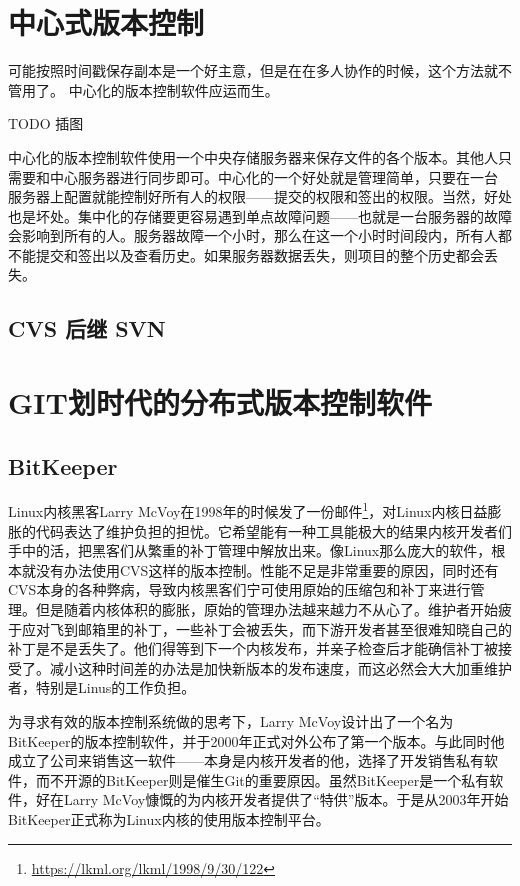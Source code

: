 \section{中心式版本控制}

可能按照时间戳保存副本是一个好主意，但是在在多人协作的时候，这个方法就不管用了。
中心化的版本控制软件应运而生。

TODO 插图

中心化的版本控制软件使用一个中央存储服务器来保存文件的各个版本。其他人只需要和中心服务器进行同步即可。中心化的一个好处就是管理简单，只要在一台 服务器上配置就能控制好所有人的权限——提交的权限和签出的权限。当然，好处也是坏处。集中化的存储要更容易遇到单点故障问题——也就是一台服务器的故障会影响到所有的人。服务器故障一个小时，那么在这一个小时时间段内，所有人都不能提交和签出以及查看历史。如果服务器数据丢失，则项目的整个历史都会丢失。


\subsection{CVS 后继 SVN}

\section{GIT划时代的分布式版本控制软件}\label{sec:git}
 
\subsection{BitKeeper}

Linux内核黑客Larry McVoy在1998年的时候发了一份邮件\footnote{\url{https://lkml.org/lkml/1998/9/30/122}}，对Linux内核日益膨胀的代码表达了维护负担的担忧。它希望能有一种工具能极大的结果内核开发者们手中的活，把黑客们从繁重的补丁管理中解放出来。像Linux那么庞大的软件，根本就没有办法使用CVS这样的版本控制。性能不足是非常重要的原因，同时还有CVS本身的各种弊病，导致内核黑客们宁可使用原始的压缩包和补丁来进行管理。但是随着内核体积的膨胀，原始的管理办法越来越力不从心了。维护者开始疲于应对飞到邮箱里的补丁，一些补丁会被丢失，而下游开发者甚至很难知晓自己的补丁是不是丢失了。他们得等到下一个内核发布，并亲子检查后才能确信补丁被接受了。减小这种时间差的办法是加快新版本的发布速度，而这必然会大大加重维护者，特别是Linus的工作负担。

为寻求有效的版本控制系统做的思考下，Larry McVoy设计出了一个名为BitKeeper的版本控制软件，并于2000年正式对外公布了第一个版本。与此同时他成立了公司来销售这一软件——本身是内核开发者的他，选择了开发销售私有软件，而不开源的BitKeeper则是催生Git的重要原因。虽然BitKeeper是一个私有软件，好在Larry McVoy慷慨的为内核开发者提供了“特供”版本。于是从2003年开始BitKeeper正式称为Linux内核的使用版本控制平台。

